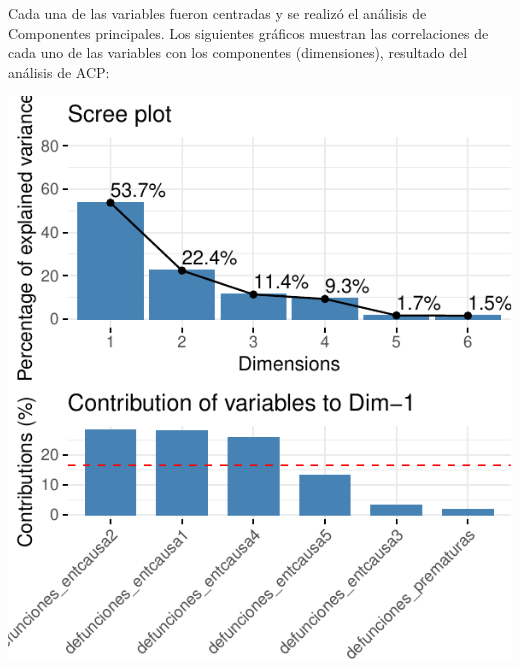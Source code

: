 Cada una de las variables fueron centradas y se realizó el análisis de
Componentes principales. Los siguientes gráficos muestran las
correlaciones de cada uno de las variables con los componentes
(dimensiones), resultado del análisis de ACP:

\includegraphics{Anexo_PCA_files/figure-latex/unnamed-chunk-1-11.pdf}